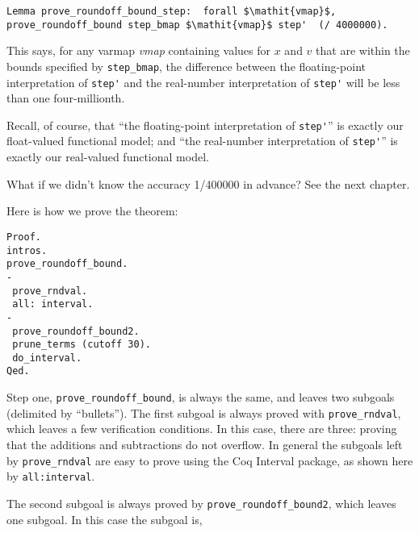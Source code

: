\documentclass[article]{memoir}
\begin{document}
\begin{lstlisting}
Lemma prove_roundoff_bound_step:  forall $\mathit{vmap}$, prove_roundoff_bound step_bmap $\mathit{vmap}$ step'  (/ 4000000).
\end{lstlisting}
This says, for any varmap \emph{vmap}
containing values for $x$ and $v$
that are within the bounds specified by \lstinline{step_bmap},
the difference between the floating-point
interpretation of \lstinline{step'}
and the real-number interpretation of \lstinline{step'}
will be less than one four-millionth.

Recall, of course, that ``the floating-point interpretation of \lstinline{step'}'' is exactly our float-valued functional model;
and ``the real-number interpretation of \lstinline{step'}''
is exactly our real-valued functional model.

What if we didn't know the accuracy 1/400000 in advance?  See the
next chapter.

Here is how we prove the theorem:
\begin{lstlisting}
Proof.
intros.
prove_roundoff_bound.
-
 prove_rndval.
 all: interval.
- 
 prove_roundoff_bound2.
 prune_terms (cutoff 30).
 do_interval.
Qed.
\end{lstlisting}
Step one, \lstinline{prove_roundoff_bound}, is always the same,
and leaves two subgoals (delimited by ``bullets'').
The first subgoal is always proved with \lstinline{prove_rndval},
which leaves a few verification conditions.
In this case, there are three: proving that the additions
and subtractions do not overflow.  In general the subgoals
left by \lstinline{prove_rndval} are easy to prove using the Coq
Interval package, as shown here by \lstinline{all:interval}.

The second subgoal is always proved by
\lstinline{prove_roundoff_bound2}, which leaves
one subgoal.  In this case the subgoal is,
\end{document}
